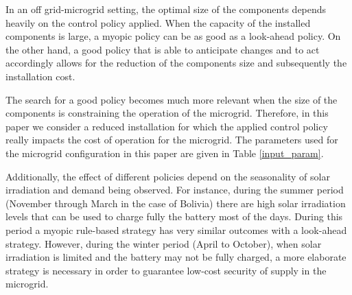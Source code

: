 \documentclass{article}
\begin{document}
In an off grid-microgrid setting, the optimal size of the components depends heavily on the control policy applied. When the capacity of the installed components is large, a myopic policy can be as good as a look-ahead policy. On the other hand, a good policy that is able to anticipate changes and to act accordingly allows for the reduction of the components size and subsequently the installation cost.

The search for a good policy becomes much more relevant when the size of the components is constraining the operation of the microgrid. Therefore, in this paper we consider a reduced installation for which the applied control policy really impacts the cost of operation for the microgrid. The parameters used for the microgrid configuration in this paper are given in Table \ref{input_param}.

Additionally, the effect of different policies depend on the seasonality of solar irradiation and demand being observed. For instance, during the summer period (November through March in the case of Bolivia) there are high solar irradiation levels that can be used to charge fully the battery most of the days. During this period a myopic rule-based strategy has very similar outcomes with a look-ahead strategy. However, during the winter period (April to October), when solar irradiation is limited and the battery may not be fully charged, a more elaborate strategy is necessary in order to guarantee low-cost security of supply in the microgrid.



\end{document}
